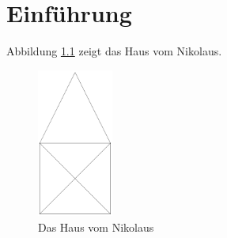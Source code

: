 \documentclass[12pt,a4paper,final]{scrbook}
\begin{document}
\chapter{Einführung}
\blindtext
Abbildung \ref{fig:Nikolaushaus} zeigt das Haus vom Nikolaus. 

\begin{figure}[b]
	\centering
	\includegraphics[width=2.5cm]{house.png}
	\caption{Das Haus vom Nikolaus}
	\label{fig:Nikolaushaus}
\end{figure}

\blindtext
\end{document}
